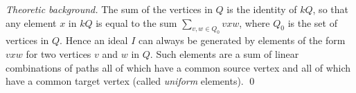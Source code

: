 \documentclass{amsart}
\theoremstyle{definition}
\theoremstyle{theoretic}
\newenvironment{theoback}
{\medskip\small\textit{Theoretic background.} }
{\qed\par\medskip}
\begin{document}

\begin{theoback} The sum of the vertices in $Q$
is the identity of $kQ$, so that any element $x$ in $kQ$ is equal to
the sum $\sum_{v,w\in Q_0} vxw$, where $Q_0$ is the set of vertices in
$Q$.  Hence an ideal $I$ can always be generated by elements of the
form $vxw$ for two vertices $v$ and $w$ in $Q$.  Such elements are a
sum of linear combinations of paths all of which have a common source
vertex and all of which have a common target vertex (called
\emph{uniform} elements).
\end{theoback}
\end{document}
